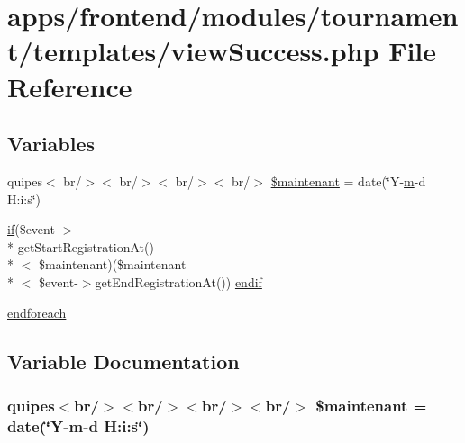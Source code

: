\hypertarget{frontend_2modules_2tournament_2templates_2view_success_8php}{\section{apps/frontend/modules/tournament/templates/view\-Success.php File Reference}
\label{frontend_2modules_2tournament_2templates_2view_success_8php}
}
\subsection*{Variables}
\begin{DoxyCompactItemize}
\item 
quipes$<$ br/$>$$<$ br/$>$$<$ br/$>$$<$ br/$>$ \hyperlink{frontend_2modules_2tournament_2templates_2view_success_8php_ab4ab6dabf2fa9ecac01d080d46257efe}{\$maintenant} = date(\char`\"{}Y-\/\hyperlink{frontend_2modules_2poker__tournament_2templates_2view_success_8php_a128ba33893be6a113de6d7895ff5d641}{m}-\/d H\-:i\-:s\char`\"{})
\item 
\hyperlink{live_2modules_2tournament_2templates_2__form_team_8php_ae30a307b320d8da5d9a945eaf68f7549}{if}(\$event-\/$>$\\*
get\-Start\-Registration\-At()\\*
$<$ \$maintenant)(\$maintenant\\*
$<$ \$event-\/$>$get\-End\-Registration\-At()) \hyperlink{frontend_2modules_2tournament_2templates_2view_success_8php_a6a4e0258f03fd41cbc37d46e04b7be7f}{endif}
\item 
\hyperlink{frontend_2modules_2tournament_2templates_2view_success_8php_a672d9707ef91db026c210f98cc601123}{endforeach}
\end{DoxyCompactItemize}


\subsection{Variable Documentation}
\hypertarget{frontend_2modules_2tournament_2templates_2view_success_8php_ab4ab6dabf2fa9ecac01d080d46257efe}{
\subsubsection[{\$maintenant}]{\setlength{\rightskip}{0pt plus 5cm}quipes$<$br/$>$$<$br/$>$$<$br/$>$$<$br/$>$ \$maintenant = date(\char`\"{}Y-\/{\bf m}-\/d H\-:i\-:s\char`\"{})}}\label{frontend_2modules_2tournament_2templates_2view_success_8php_ab4ab6dabf2fa9ecac01d080d46257efe}


